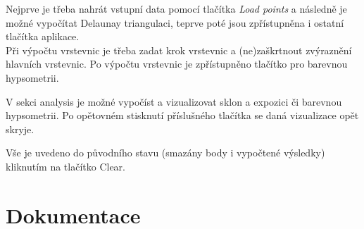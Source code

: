 \documentclass[a4paper, 12pt]{article}
\begin{document}
Nejprve je třeba nahrát vstupní data pomocí tlačítka \textit{Load points} a následně je možné vypočítat Delaunay triangulaci, teprve poté jsou zpřístupněna i ostatní tlačítka aplikace. \\


Při výpočtu vrstevnic je třeba zadat krok vrstevnic a (ne)zaškrtnout zvýraznění hlavních vrstevnic. Po výpočtu vrstevnic je zpřístupněno tlačítko pro barevnou hypsometrii.


V sekci analysis je možné vypočíst a vizualizovat sklon a expozici či barevnou hypsometrii. Po opětovném stisknutí příslušného tlačítka se daná vizualizace opět skryje.



Vše je uvedeno do původního stavu (smazány body i vypočtené výsledky) kliknutím na tlačítko Clear.\\
\clearpage





\clearpage


\section {Dokumentace}

%
\end{document}
